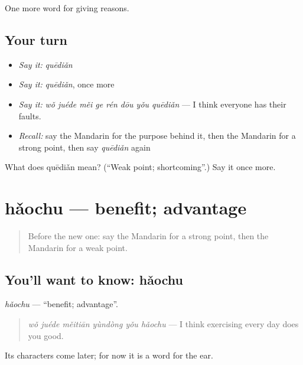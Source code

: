 \begin{grammarlens}[title={What you've built}]
One more word for giving reasons.
\end{grammarlens}

\subsection*{Your turn}
\begin{itemize}
\raggedright
  \item \emph{Say it:} \emph{quēdiǎn}
  \item \emph{Say it:} \emph{quēdiǎn}, once more
  \item \emph{Say it:} \emph{wǒ juéde měi ge rén dōu yǒu quēdiǎn} — I think everyone has their faults.
  \item \emph{Recall:} say the Mandarin for the purpose behind it, then the Mandarin for a strong point, then say \emph{quēdiǎn} again
\end{itemize}

\begin{tcolorbox}[breakable,colback=teal!4,colframe=teal!35!black,title={Before you move on}]
What does quēdiǎn mean? (\textquotedblleft{}Weak point; shortcoming\textquotedblright{}.) Say it once more.
\end{tcolorbox}
\section[hǎochu]{hǎochu — benefit; advantage}

\label{lesson:ZH-C373-haochu}



\begin{quote}
Before the new one: say the Mandarin for a strong point, then the Mandarin for a weak point.
\end{quote}

\subsection*{You'll want to know: hǎochu}
\emph{hǎochu} — \textquotedblleft{}benefit; advantage\textquotedblright{}.

\begin{quote}
\emph{wǒ juéde měitiān yùndòng yǒu hǎochu} — I think exercising every day does you good.
\end{quote}

Its characters come later; for now it is a word for the ear.

